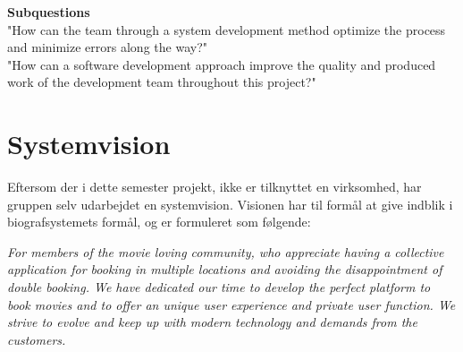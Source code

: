 \textbf{Subquestions} \\
"How can the team through a system development method optimize the process and minimize errors along the way?" \\

"How can a software development approach improve the quality and produced work of the development team throughout this project?"\\

\section{Systemvision}
Eftersom der i dette semester projekt, ikke er tilknyttet en virksomhed, har gruppen selv udarbejdet en systemvision.
Visionen har til formål at give indblik i biografsystemets formål, og er formuleret som følgende: \\

\begin{center}
    \textit{For members of the movie loving community, who appreciate having a collective application for booking 
    in multiple locations and avoiding the disappointment of double booking. We have dedicated our 
    time to develop the perfect platform to book movies and to offer an unique user experience and private user function. 
    We strive to evolve and keep up with modern technology and demands from the customers.}
\end{center}
















